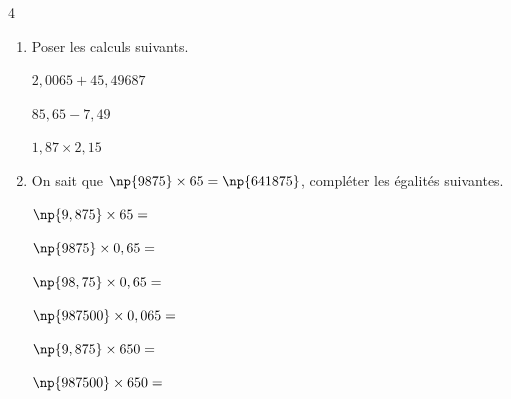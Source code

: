\documentclass[a4paper]{book}
\begin{document}
{    \begin{exerciceNote}{4}
        \begin{enumerate}
            \item Poser les calculs suivants.

            \medskip
        
            \begin{minipage}{0.33\linewidth}
                \quad $2,0065+45,49687$
                \vspace{4cm}
            \end{minipage}
            \hfill\vline\hfill
            \begin{minipage}{0.33\linewidth}
                \quad $85,65-7,49$
                \vspace{4cm}
            \end{minipage}        
            \hfill\vline\hfill
            \begin{minipage}{0.33\linewidth}
                \quad $1,87 \times 2,15 $
                \vspace{4cm}
            \end{minipage}

            \item On sait que $\np{9875}\times65=\np{641875}$, compléter les égalités suivantes.

            \medskip
        
            \begin{minipage}{0.33\linewidth}
                $\np{9,875}\times65=$
                
                \bigskip
                
                 $\np{9875}\times0,65=$
            \end{minipage}
            \hfill\vline\hfill
            \begin{minipage}{0.33\linewidth}
                \quad $\np{98,75}\times0,65=$
                
                \bigskip
                
                 \quad $\np{987500}\times0,065=$
            \end{minipage}        
            \hfill\vline\hfill
            \begin{minipage}{0.33\linewidth}
                \quad $\np{9,875}\times650=$
                
                \bigskip
                
                \quad $\np{987500}\times650=$
            \end{minipage}
        \end{enumerate}
    \end{exerciceNote}


}
\end{document}

